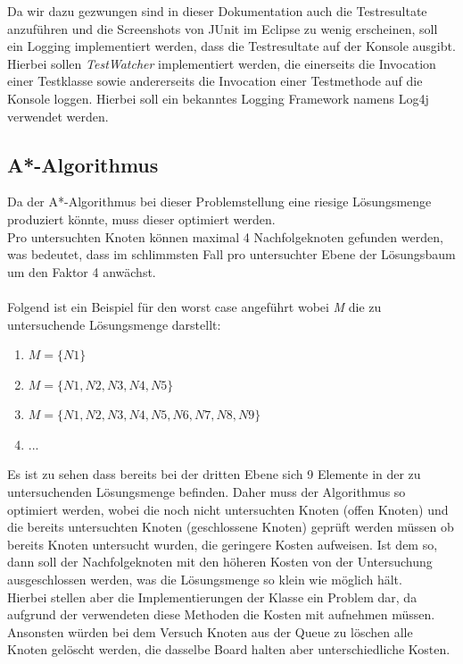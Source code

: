 \documentclass[11pt, a4paper, twoside]{article}   	%
\begin{document}
Da wir dazu gezwungen sind in dieser Dokumentation auch die Testresultate anzuführen und die Screenshots von JUnit im Eclipse zu wenig erscheinen, soll ein Logging implementiert werden, dass die Testresultate auf der Konsole ausgibt. Hierbei sollen \emph{TestWatcher} implementiert werden, die einerseits die Invocation einer Testklasse sowie andererseits die Invocation einer Testmethode auf die Konsole loggen. Hierbei soll ein bekanntes Logging Framework namens Log4j verwendet werden.

\subsection{A*-Algorithmus}
Da der A*-Algorithmus bei dieser Problemstellung eine riesige Lösungsmenge produziert könnte, muss dieser optimiert werden.\\
Pro untersuchten Knoten können maximal 4 Nachfolgeknoten gefunden werden, was bedeutet, dass im schlimmsten Fall pro untersuchter Ebene der Lösungsbaum um den Faktor 4 anwächst.\\\\
Folgend ist ein Beispiel für den worst case angeführt wobei \emph{M} die zu untersuchende Lösungsmenge darstellt:
\begin{enumerate}
	\item $M=\{N1\}$
	\item $M=\{N1, N2, N3, N4, N5\}$
	\item $M=\{N1, N2, N3, N4, N5, N6, N7, N8, N9\}$
	\item ...
\end{enumerate}
Es ist zu sehen dass bereits bei der dritten Ebene sich 9 Elemente in der zu untersuchenden Lösungsmenge befinden. Daher muss der Algorithmus so optimiert werden, wobei die noch nicht untersuchten Knoten (offen Knoten) und die bereits untersuchten Knoten (geschlossene Knoten) geprüft werden müssen ob bereits Knoten untersucht wurden, die geringere Kosten aufweisen. Ist dem so, dann soll der Nachfolgeknoten mit den höheren Kosten von der Untersuchung ausgeschlossen werden, was die Lösungsmenge so klein wie möglich hält.\\
Hierbei stellen aber die Implementierungen  der Klasse  ein Problem dar, da aufgrund der verwendeten  diese Methoden die Kosten mit aufnehmen müssen.\\
Ansonsten würden bei dem Versuch Knoten aus der Queue zu löschen alle Knoten gelöscht werden, die dasselbe Board halten aber unterschiedliche Kosten.\\
\end{document}
